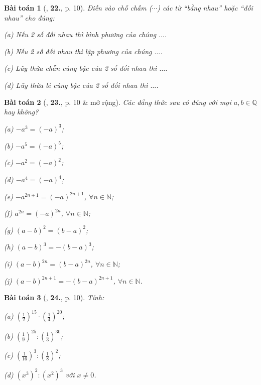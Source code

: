 \documentclass{article}
\numberwithin{equation}{section}
\newtheorem{baitoan}{Bài toán}[section]
\begin{document}
\begin{baitoan}[\cite{Binh_Toan_7_tap_1}, \textbf{22.}, p. 10]
	Điền vào chỗ chấm ($\cdots$) các từ ``bằng nhau'' hoặc ``đối nhau'' cho đúng:
	\begin{enumerate*}
		\item[(a)] Nếu 2 số đối nhau thì bình phương của chúng $\ldots$.
		\item[(b)] Nếu 2 số đối nhau thì lập phương của chúng $\ldots$.
		\item[(c)] Lũy thừa chẵn cùng bậc của 2 số đối nhau thì $\ldots$.
		\item[(d)] Lũy thừa lẻ cùng bậc của 2 số đối nhau thì $\ldots$.
	\end{enumerate*}
\end{baitoan}

\begin{baitoan}[\cite{Binh_Toan_7_tap_1}, \textbf{23.}, p. 10 \& mở rộng]
	Các đẳng thức sau có đúng với mọi $a,b\in\mathbb{Q}$ hay không?
	\begin{enumerate*}
		\item[(a)] $-a^3 = (-a)^3$;
		\item[(b)] $-a^5 = (-a)^5$;
		\item[(c)] $-a^2 = (-a)^2$;
		\item[(d)] $-a^4 = (-a)^4$;
		\item[(e)] $-a^{2n+1} = (-a)^{2n+1}$, $\forall n\in\mathbb{N}$;
		\item[(f)] $a^{2n} = (-a)^{2n}$, $\forall n\in\mathbb{N}$;
		\item[(g)] $(a - b)^2 = (b - a)^2$;
		\item[(h)] $(a - b)^3 = -(b - a)^3$;
		\item[(i)] $(a - b)^{2n} = (b - a)^{2n}$, $\forall n\in\mathbb{N}$;
		\item[(j)] $(a - b)^{2n+1} = -(b - a)^{2n+1}$, $\forall n\in\mathbb{N}$.
	\end{enumerate*}
\end{baitoan}

\begin{baitoan}[\cite{Binh_Toan_7_tap_1}, \textbf{24.}, p. 10]
	Tính:
	\begin{enumerate*}
		\item[(a)] $\left(\frac{1}{2}\right)^{15}\cdot\left(\frac{1}{4}\right)^{20}$;
		\item[(b)] $\left(\frac{1}{9}\right)^{25}:\left(\frac{1}{3}\right)^{30}$;
		\item[(c)] $\left(\frac{1}{16}\right)^3:\left(\frac{1}{8}\right)^2$;
		\item[(d)] $(x^3)^2:(x^2)^3$ với $x\ne 0$.
	\end{enumerate*}
\end{baitoan}
\end{document}
